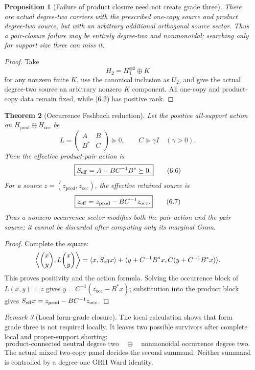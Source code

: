 \documentclass[11pt]{article}
\newtheorem{theorem}{Theorem}[section]
\newtheorem{proposition}[theorem]{Proposition}
\theoremstyle{definition}
\theoremstyle{remark}
\newtheorem{remark}[theorem]{Remark}
\newcommand{\occ}{\mathrm{occ}}
\newcommand{\prodsec}{\mathrm{prod}}
\begin{document}
\begin{proposition}[Failure of product closure need not create grade three]
\label{cth:no-grade-three}
There are actual degree-two carriers with the prescribed one-copy source and
product degree-two source, but with an arbitrary additional orthogonal source
sector.  Thus a pair-closure failure may be entirely degree-two and
nonmonoidal; searching only for support size three can miss it.
\end{proposition}

\begin{proof}
Take
\[
 H_2=H_1^{\otimes2}\oplus K
\]
for any nonzero finite $K$, use the canonical inclusion as $U_2$, and give the
actual degree-two source an arbitrary nonzero $K$ component.  All one-copy and
product-copy data remain fixed, while \textup{(6.2)} has positive rank.
\end{proof}

\begin{theorem}[Occurrence Feshbach reduction]
\label{thm:pair-Feshbach}
Let the positive all-support action on
$H_{\prodsec}\oplus H_{\occ}$ be
\[
 L=\begin{pmatrix}A&B\\B^*&C\end{pmatrix}\succeq0,
 \qquad C\succeq\gamma I\quad(\gamma>0).
 \tag{6.5}
\]
Then the effective product-pair action is
\[
 \boxed{S_{\rm eff}=A-BC^{-1}B^*\succeq0.}
 \tag{6.6}
\]
For a source $z=(z_{\prodsec},z_{\occ})$, the effective retained source is
\[
 \boxed{z_{\rm eff}=z_{\prodsec}-BC^{-1}z_{\occ}.}
 \tag{6.7}
\]
Thus a nonzero occurrence sector modifies both the pair action and the pair
source; it cannot be discarded after computing only its marginal Gram.
\end{theorem}

\begin{proof}
Complete the square:
\[
 \left\langle\binom{x}{y},L\binom{x}{y}\right\rangle
 =\langle x,S_{\rm eff}x\rangle
 +\langle y+C^{-1}B^*x,
 C(y+C^{-1}B^*x)\rangle.
\]
This proves positivity and the action formula.  Solving the occurrence block
of $L(x,y)=z$ gives
$y=C^{-1}(z_{\occ}-B^*x)$; substitution into the product block gives
$S_{\rm eff}x=z_{\prodsec}-BC^{-1}z_{\occ}$.
\end{proof}

\begin{remark}[Local form-grade closure]
The local calculation shows that form grade three is not required locally.  It leaves two possible
survivors after complete local and proper-support shorting:
\[
 \boxed{
 \text{product-connected neutral degree two}
 \quad\oplus\quad
 \text{nonmonoidal occurrence degree two}.}
 \tag{6.8}
\]
The actual mixed two-copy panel decides the second summand.  Neither summand is
controlled by a degree-one GRH Ward identity.
\end{remark}
\end{document}
